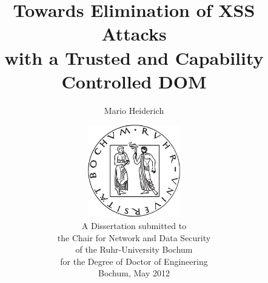 \documentclass[abstracton,a4paper,11pt,titlepage,openright]{scrreprt}
\begin{document}
\title{Towards Elimination of XSS Attacks\\with a Trusted and Capability Controlled DOM}
\author{Mario Heiderich}
\date{
  \vspace{1cm}
  \includegraphics[width=4cm]{img/rublogo.pdf}\\
  \vspace{2cm}
  {\Large\sc A Dissertation submitted to \\the Chair for Network and Data Security\\}
  {\small of the Ruhr-University Bochum}\\
  {\small for the Degree of Doctor of Engineering}\\
  \vspace{2cm}
  {\small Bochum, May 2012}
}
\maketitle
{}
\end{document}
